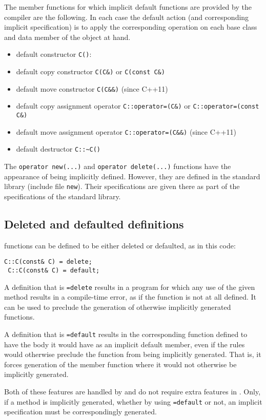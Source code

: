 The member functions for which implicit default functions are provided by the compiler are the following. In each case the default action (and corresponding implicit specification) is to apply the corresponding operation on each base class and data member of the object at hand.
\begin{itemize}
	\item default constructor \lstinline|C()|: 
	\item default copy constructor \lstinline|C(C&)| or \lstinline|C(const C&)|
	\item default move constructor \lstinline|C(C&&)| (since C++11)
	\item default copy assignment operator \lstinline|C::operator=(C&)| or \lstinline|C::operator=(const C&)|
	\item default move assignment operator \lstinline|C::operator=(C&&)| (since C++11)
	\item default destructor \lstinline|C::~C()|
\end{itemize}


The \lstinline|operator new(...)| and 
\lstinline|operator delete(...)| functions have the appearance of being implicitly defined. However, they are defined in the standard library
(include file \lstinline|new|). Their specifications are given there as
part of the specifications of the standard library.

\subsection{Deleted and defaulted definitions}

 \lang functions can be defined to be either deleted or defaulted, as in this code:
 \begin{lstlisting}[deletekeywords={default}]
 C::C(const& C) = delete; 
 C::C(const& C) = default; 
 \end{lstlisting}
 A definition that is \lstinline|=delete| results in a program for which any use of the given method results in a compile-time error,
 as if the function is not at all defined. It can be used to preclude the
 generation of otherwise implicitly generated functions.
 
 A definition that is \lstinline|=default| results in the corresponding
 function defined to have the body it would have as an implicit default
 member, even if the \lang rules would otherwise preclude the 
 function from being implicitly generated. That is, it forces 
 generation of the member function where it would not otherwise be implicitly generated.
 
Both of these features are handled by \lang and do not require 
extra features in \NAME. Only, if a method is implicitly generated, whether by using \lstinline|=default| or not, an implicit specification must be correspondingly generated.
